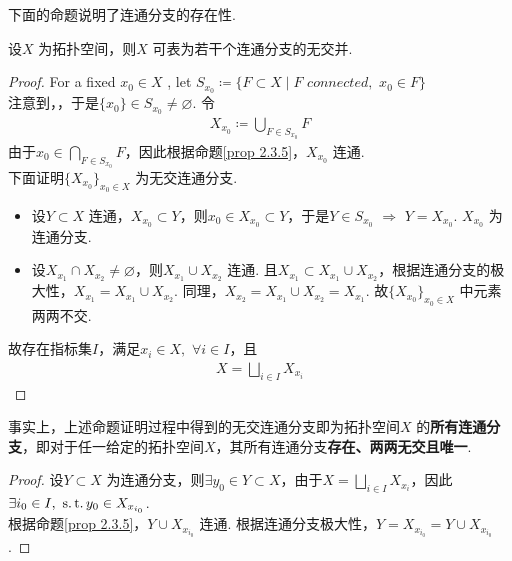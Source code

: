 	\vspace*{2em}
	下面的命题说明了连通分支的存在性.
	\begin{proposition}\label{prop 2.3.8}
		设$X$ 为拓扑空间，则$X$ 可表为若干个连通分支的无交并.
		
		\vspace{2em}
		\begin{proof}
			For a fixed $x_0 \in X$ , let $S_{x_0} \coloneqq \{ F \subset X \mid F \,\, connected , \,\, x_0 \in F \}$\\
			注意到，，于是$\{ x_0 \} \in S_{x_0} \neq \varnothing$. 令
			\begin{align}
				X_{x_0} \coloneqq \bigcup_{F \in S_{x_0}}{F}
			\end{align}
			由于$x_0 \in \underset{F \in S_{x_0}}{\bigcap}{F}$，因此根据命题\ref{prop 2.3.5}，$X_{x_0}$ 连通.\\
			下面证明$\{ X_{x_0} \}_{x_0 \in X}$ 为无交连通分支.
			\begin{itemize}
				\item 设$Y \subset X$ 连通，$X_{x_0} \subset Y$，则$x_0 \in X_{x_0} \subset Y$，于是$Y \in S_{x_0}$ $\Rightarrow$ $Y = X_{x_0}$. $X_{x_0}$ 为连通分支.
				
				\item 设$X_{x_1} \cap X_{x_2} \neq \varnothing$，则$X_{x_1} \cup X_{x_2}$ 连通. 且$X_{x_1} \subset X_{x_1} \cup X_{x_2}$，根据连通分支的极大性，$X_{x_1} = X_{x_1} \cup X_{x_2}$. 同理，$X_{x_2} = X_{x_1} \cup X_{x_2} = X_{x_1}$. 故$\{ X_{x_0} \}_{x_0 \in X}$ 中元素两两不交.
			\end{itemize}
			故存在指标集$I$，满足$x_i \in X , \,\, \forall i \in I$，且
			\begin{align}
				X = \bigsqcup_{i \in I}{X_{x_i}}
			\end{align}
		\end{proof}
	
		\begin{rmk}
			事实上，上述命题证明过程中得到的无交连通分支即为拓扑空间$X$ 的\textbf{所有连通分支}，即对于任一给定的拓扑空间$X$，其所有连通分支\textbf{存在、两两无交且唯一}.
			\vspace*{2em}
			\begin{proof}
				设$Y \subset X$ 为连通分支，则$\exists y_0 \in Y \subset X$，由于$X = \underset{i \in I}{\bigsqcup}{X_{x_i}}$，因此$\exists i_0 \in I , \,\, \operatorname{s.t.} y_0 \in X_{x_{i_0}}$.\\
				根据命题\ref{prop 2.3.5}，$Y \cup X_{x_{i_0}}$ 连通. 根据连通分支极大性，$Y = X_{x_{i_0}} = Y \cup X_{x_{i_0}}$.
			\end{proof}
		\end{rmk}
	\end{proposition}

